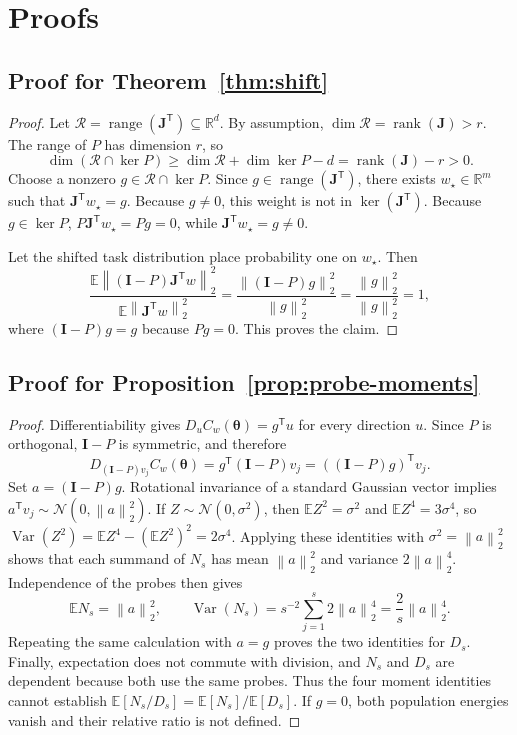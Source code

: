 \documentclass[aps,prx,reprint,superscriptaddress,floatfix]{revtex4-2}
\newcommand{\E}{\mathbb{E}}
\newcommand{\R}{\mathbb{R}}
\newcommand{\J}{\mathbf{J}}
\newcommand{\I}{\mathbf{I}}
\newcommand{\trans}{\mathsf{T}}
\newcommand{\norm}[1]{\left\lVert #1\right\rVert}
\begin{document}
\clearpage



\clearpage
\appendix

\section{Proofs}

\subsection{Proof for Theorem~\ref{thm:shift}}
\label{app:proof-shift}

\begin{proof}
Let $\mathcal R=\operatorname{range}(\J^{\trans})\subseteq\R^d$.  By
assumption, $\dim\mathcal R=\operatorname{rank}(\J)>r$.  The range of $P$ has
dimension $r$, so
\[
 \dim(\mathcal R\cap\ker P)
 \ge \dim\mathcal R+\dim\ker P-d
 =\operatorname{rank}(\J)-r>0.
\]
Choose a nonzero $g\in\mathcal R\cap\ker P$.  Since
$g\in\operatorname{range}(\J^{\trans})$, there exists
$w_\star\in\R^m$ such that $\J^{\trans}w_\star=g$.  Because $g\ne0$, this
weight is not in $\ker(\J^{\trans})$.  Because $g\in\ker P$,
$P\J^{\trans}w_\star=Pg=0$, while
$\J^{\trans}w_\star=g\ne0$.

Let the shifted task distribution place probability one on $w_\star$.  Then
\[
 \frac{\E\norm{(\I-P)\J^{\trans}w}_2^2}
 {\E\norm{\J^{\trans}w}_2^2}
 =\frac{\norm{(\I-P)g}_2^2}{\norm g_2^2}
 =\frac{\norm g_2^2}{\norm g_2^2}=1,
\]
where $(\I-P)g=g$ because $Pg=0$.  This proves the claim.
\end{proof}

\subsection{Proof for Proposition~\ref{prop:probe-moments}}
\label{app:proof-probe-moments}

\begin{proof}
Differentiability gives
$D_uC_w(\bm\theta)=g^{\trans}u$ for every direction $u$.  Since $P$ is
orthogonal, $\I-P$ is symmetric, and therefore
\[
 D_{(\I-P)v_j}C_w(\bm\theta)
 =g^{\trans}(\I-P)v_j
 =((\I-P)g)^{\trans}v_j .
\]
Set $a=(\I-P)g$.  Rotational invariance of a standard Gaussian vector implies
$a^{\trans}v_j\sim\mathcal N(0,\norm a_2^2)$.  If
$Z\sim\mathcal N(0,\sigma^2)$, then
$\E Z^2=\sigma^2$ and $\E Z^4=3\sigma^4$, so
$\operatorname{Var}(Z^2)=\E Z^4-(\E Z^2)^2=2\sigma^4$.
Applying these identities with $\sigma^2=\norm a_2^2$ shows that each
summand of $N_s$ has mean $\norm a_2^2$ and variance
$2\norm a_2^4$.  Independence of the probes then gives
\[
 \E N_s=\norm a_2^2,\qquad
 \operatorname{Var}(N_s)
 =s^{-2}\sum_{j=1}^{s}2\norm a_2^4
 =\frac{2}{s}\norm a_2^4.
\]
Repeating the same calculation with $a=g$ proves the two identities for
$D_s$.  Finally, expectation does not commute with division, and $N_s$ and
$D_s$ are dependent because both use the same probes.  Thus the four moment
identities cannot establish $\E[N_s/D_s]=\E[N_s]/\E[D_s]$.  If $g=0$, both
population energies vanish and their relative ratio is not defined.
\end{proof}
\end{document}
